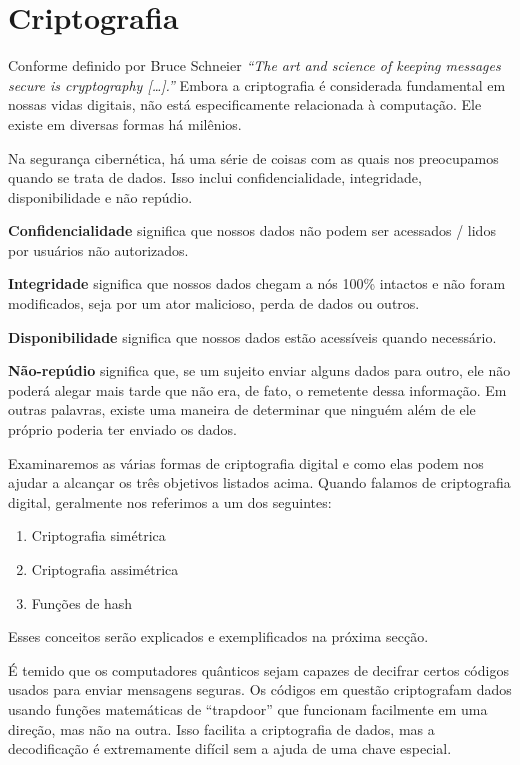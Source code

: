 \section{Criptografia}
Conforme definido por Bruce Schneier \textit{``The art and science of keeping messages secure is cryptography […].''} \cite{13} Embora a criptografia é considerada fundamental em nossas vidas digitais, não está especificamente relacionada à computação. Ele existe em diversas formas há milênios.

Na segurança cibernética, há uma série de coisas com as quais nos preocupamos quando se trata de dados. Isso inclui confidencialidade, integridade, disponibilidade e não repúdio.

\textbf{Confidencialidade} significa que nossos dados não podem ser acessados / lidos por usuários não autorizados.

\textbf{Integridade} significa que nossos dados chegam a nós 100\% intactos e não foram modificados, seja por um ator malicioso, perda de dados ou outros.

\textbf{Disponibilidade} significa que nossos dados estão acessíveis quando necessário.

\textbf{Não-repúdio} significa que, se um sujeito enviar alguns dados para outro, ele não poderá alegar mais tarde que não era, de fato, o remetente dessa informação. Em outras palavras, existe uma maneira de determinar que ninguém além de ele próprio poderia ter enviado os dados.

Examinaremos as várias formas de criptografia digital e como elas podem nos ajudar a alcançar os três objetivos listados acima. Quando falamos de criptografia digital, geralmente nos referimos a um dos seguintes:
\begin{enumerate}
  \item Criptografia simétrica
  \item Criptografia assimétrica
  \item Funções de hash
\end{enumerate}

Esses conceitos serão explicados e exemplificados na próxima secção.

É temido que os computadores quânticos sejam capazes de decifrar certos códigos usados para enviar mensagens seguras. Os códigos em questão criptografam dados usando funções matemáticas de ``trapdoor'' que funcionam facilmente em uma direção, mas não na outra. Isso facilita a criptografia de dados, mas a decodificação é extremamente difícil sem a ajuda de uma chave especial.

